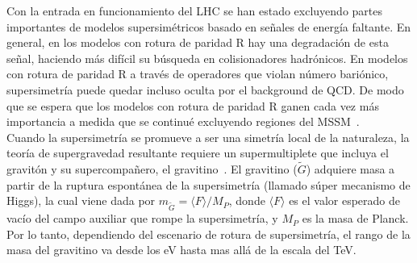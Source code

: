 Con la entrada en funcionamiento del LHC se han estado excluyendo
partes importantes de modelos supersimétricos basado en señales de
energía faltante. En general, en los modelos con rotura de paridad R hay
una degradación de esta señal, haciendo más difícil su búsqueda en
colisionadores hadrónicos. En modelos con rotura de paridad R a través
de operadores que violan número bariónico, supersimetría puede quedar
incluso oculta por el background de QCD. De modo que se espera que los
modelos con rotura de paridad R ganen cada vez más importancia a
medida que se continué excluyendo regiones del MSSM~\cite{Bomark:2011fj}.\\

Cuando la supersimetría se promueve a ser una simetría local de la
naturaleza, la teoría de supergravedad resultante requiere un
supermultiplete que incluya el gravitón y su supercompañero, el
gravitino~\cite{Martin:1997ns,Nilles:1983ge}. El gravitino ($\tilde
G$) adquiere masa a partir de la ruptura espontánea de la
supersimetría (llamado súper mecanismo de Higgs), la cual viene dada
por $m_{\tilde G}=\langle F\rangle/M_P$, donde $\langle F\rangle$ es el valor esperado de vacío
del campo auxiliar que rompe la supersimetría, y $M_P$ es la masa de
Planck. Por lo tanto, dependiendo del escenario de rotura de
supersimetría, el rango de la masa del gravitino va desde los eV hasta
mas allá de la escala del TeV.

